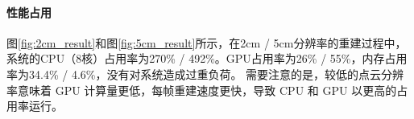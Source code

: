 \paragraph{性能占用}

\par 图\ref{fig:2cm_result}和图\ref{fig:5cm_result}所示，在2cm / 5cm分辨率的重建过程中，系统的CPU（8核）占用率为270\% / 492\%。GPU占用率为26\% / 55\%，内存占用率为34.4\% / 4.6\%，没有对系统造成过重负荷。
需要注意的是，较低的点云分辨率意味着 GPU 计算量更低，每帧重建速度更快，导致 CPU 和 GPU 以更高的占用率运行。

\begin{figure}[htbp]
	\centering
\end{figure}
